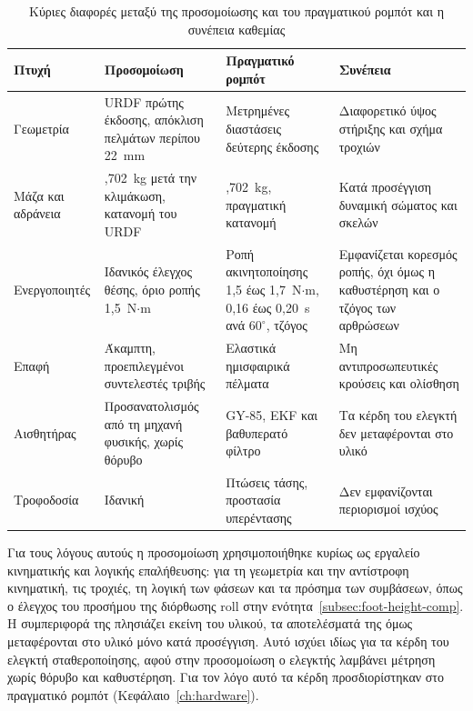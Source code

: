 \documentclass[11pt]{report}
\begin{document}
\begin{table}[htbp]
    \centering
    \small
    \begin{tabular}{@{}>{\raggedright\arraybackslash}p{2.1cm}
                        >{\raggedright\arraybackslash}p{3.9cm}
                        >{\raggedright\arraybackslash}p{3.6cm}
                        >{\raggedright\arraybackslash}p{4.0cm}@{}}
        \toprule
        Πτυχή & Προσομοίωση & Πραγματικό ρομπότ & Συνέπεια \\
        \midrule
        Γεωμετρία &
        URDF πρώτης έκδοσης, απόκλιση πελμάτων περίπου 22~mm &
        Μετρημένες διαστάσεις δεύτερης έκδοσης &
        Διαφορετικό ύψος στήριξης και σχήμα τροχιών \\
        \midrule
        Μάζα και αδράνεια &
        1,702~kg μετά την κλιμάκωση, κατανομή του URDF &
        1,702~kg, πραγματική κατανομή &
        Κατά προσέγγιση δυναμική σώματος και σκελών \\
        \midrule
        Ενεργοποιητές &
        Ιδανικός έλεγχος θέσης, όριο ροπής 1,5~N$\cdot$m &
        Ροπή ακινητοποίησης 1,5 έως 1,7~N$\cdot$m, 0,16 έως 0,20~s ανά $60^\circ$, τζόγος &
        Εμφανίζεται κορεσμός ροπής, όχι όμως η καθυστέρηση και ο τζόγος των αρθρώσεων \\
        \midrule
        Επαφή &
        Άκαμπτη, προεπιλεγμένοι συντελεστές τριβής &
        Ελαστικά ημισφαιρικά πέλματα &
        Μη αντιπροσωπευτικές κρούσεις και ολίσθηση \\
        \midrule
        Αισθητήρας &
        Προσανατολισμός από τη μηχανή φυσικής, χωρίς θόρυβο &
        GY-85, EKF και βαθυπερατό φίλτρο &
        Τα κέρδη του ελεγκτή δεν μεταφέρονται στο υλικό \\
        \midrule
        Τροφοδοσία &
        Ιδανική &
        Πτώσεις τάσης, προστασία υπερέντασης &
        Δεν εμφανίζονται περιορισμοί ισχύος \\
        \bottomrule
    \end{tabular}
    \caption[Διαφορές προσομοίωσης και πραγματικού ρομπότ]{Κύριες διαφορές
    μεταξύ της προσομοίωσης και του πραγματικού ρομπότ και η συνέπεια καθεμίας}
    \label{tab:sim-limits}
\end{table}

Για τους λόγους αυτούς η προσομοίωση χρησιμοποιήθηκε κυρίως ως εργαλείο
κινηματικής και λογικής επαλήθευσης: για τη γεωμετρία και την αντίστροφη
κινηματική, τις τροχιές, τη λογική των φάσεων και τα πρόσημα των συμβάσεων,
όπως ο έλεγχος του προσήμου της διόρθωσης roll στην
ενότητα~\ref{subsec:foot-height-comp}. Η συμπεριφορά της πλησιάζει εκείνη του
υλικού, τα αποτελέσματά της όμως μεταφέρονται στο υλικό μόνο κατά προσέγγιση.
Αυτό ισχύει ιδίως για τα κέρδη του ελεγκτή σταθεροποίησης, αφού στην
προσομοίωση ο ελεγκτής λαμβάνει μέτρηση χωρίς θόρυβο και καθυστέρηση. Για τον
λόγο αυτό τα κέρδη προσδιορίστηκαν στο πραγματικό ρομπότ
(Κεφάλαιο~\ref{ch:hardware}).
\end{document}
